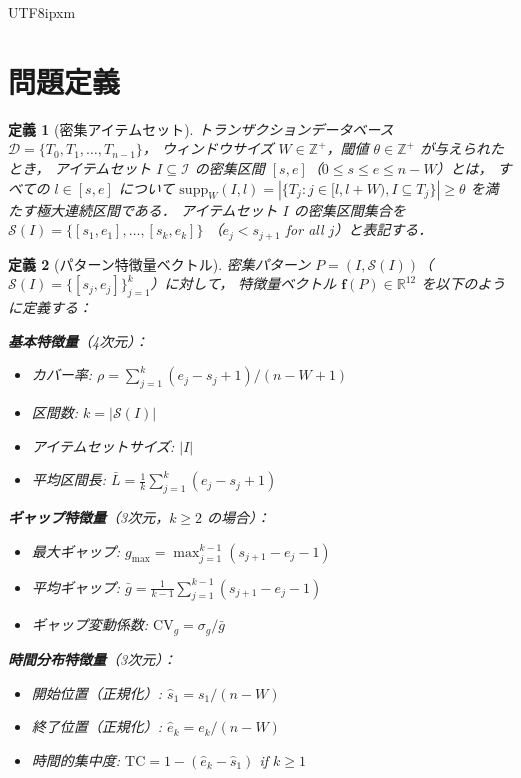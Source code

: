 \documentclass[conference]{IEEEtran}
\newtheorem{definition}{定義}
\begin{document}
\begin{CJK}{UTF8}{ipxm}
\section{問題定義}
\label{sec:problem}

\begin{definition}[密集アイテムセット]
\label{def:dense}
トランザクションデータベース $\mathcal{D} = \{T_0, T_1, \ldots, T_{n-1}\}$，
ウィンドウサイズ $W \in \mathbb{Z}^+$，閾値 $\theta \in \mathbb{Z}^+$ が与えられたとき，
アイテムセット $I \subseteq \mathcal{I}$ の\emph{密集区間} $[s, e]$（$0 \leq s \leq e \leq n - W$）とは，
すべての $l \in [s, e]$ について
$\text{supp}_W(I, l) = |\{T_j : j \in [l, l+W), I \subseteq T_j\}| \geq \theta$
を満たす極大連続区間である．
アイテムセット $I$ の密集区間集合を $\mathcal{S}(I) = \{[s_1, e_1], \ldots, [s_k, e_k]\}$
（$e_j < s_{j+1}$ for all $j$）と表記する．
\end{definition}

\begin{definition}[パターン特徴量ベクトル]
\label{def:features}
密集パターン $P = (I, \mathcal{S}(I))$（$\mathcal{S}(I) = \{[s_j, e_j]\}_{j=1}^{k}$）に対して，
特徴量ベクトル $\mathbf{f}(P) \in \mathbb{R}^{12}$ を以下のように定義する：

\noindent\textbf{基本特徴量}（4次元）：
\begin{itemize}[leftmargin=*,nosep]
    \item カバー率: $\rho = \sum_{j=1}^{k}(e_j - s_j + 1) / (n - W + 1)$
    \item 区間数: $k = |\mathcal{S}(I)|$
    \item アイテムセットサイズ: $|I|$
    \item 平均区間長: $\bar{L} = \frac{1}{k}\sum_{j=1}^{k}(e_j - s_j + 1)$
\end{itemize}

\noindent\textbf{ギャップ特徴量}（3次元，$k \geq 2$ の場合）：
\begin{itemize}[leftmargin=*,nosep]
    \item 最大ギャップ: $g_{\max} = \max_{j=1}^{k-1}(s_{j+1} - e_j - 1)$
    \item 平均ギャップ: $\bar{g} = \frac{1}{k-1}\sum_{j=1}^{k-1}(s_{j+1} - e_j - 1)$
    \item ギャップ変動係数: $\text{CV}_g = \sigma_g / \bar{g}$
\end{itemize}

\noindent\textbf{時間分布特徴量}（3次元）：
\begin{itemize}[leftmargin=*,nosep]
    \item 開始位置（正規化）: $\hat{s}_1 = s_1 / (n - W)$
    \item 終了位置（正規化）: $\hat{e}_k = e_k / (n - W)$
    \item 時間的集中度: $\text{TC} = 1 - (\hat{e}_k - \hat{s}_1)$ if $k \geq 1$
\end{itemize}


\end{definition}
\end{CJK}
\end{document}
